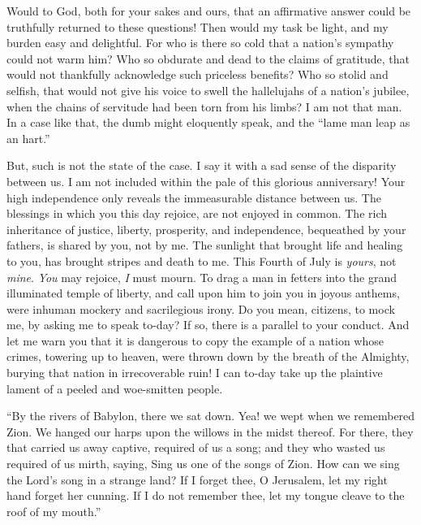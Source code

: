 Would to God, both for your sakes and ours, that an affirmative answer
could be truthfully returned to these questions! Then would my task be
light, and my burden easy and delightful. For who is there so cold that
a nation's sympathy could not warm him? Who so obdurate and dead to the
claims of gratitude, that would not thankfully acknowledge such
priceless benefits? Who so stolid and selfish, that would not give his
voice to swell the hallelujahs of a nation's jubilee, when the chains of
servitude had been torn from his limbs? I am not that man. In a case
like that, the dumb might eloquently speak, and the ``lame man leap as
an hart.''

But, such is not the state of the case. I say it with a sad sense of the
disparity between us. I am not included within the pale of this glorious
anniversary! Your high independence only reveals the immeasurable
distance between us. The blessings in which you this day rejoice, are
not enjoyed in common. The rich inheritance of justice, liberty,
prosperity, and independence, bequeathed by your fathers, is shared by
you, not by me. The sunlight that brought life and healing to you, has
brought stripes and death to me. This Fourth of July is \emph{yours},
not \emph{mine}. \emph{You} may rejoice, \emph{I} must mourn. To drag a
man in fetters into the grand illuminated temple of liberty, and call
upon him to join you in joyous anthems, were inhuman mockery and
sacrilegious irony. Do you mean,
{\protect\hypertarget{442}{}{}}citizens, to mock me, by asking me to
speak to-day? If so, there is a parallel to your conduct. And let me
warn you that it is dangerous to copy the example of a nation whose
crimes, towering up to heaven, were thrown down by the breath of the
Almighty, burying that nation in irrecoverable ruin! I can to-day take
up the plaintive lament of a peeled and woe-smitten people.

``By the rivers of Babylon, there we sat down. Yea! we wept when we
remembered Zion. We hanged our harps upon the willows in the midst
thereof. For there, they that carried us away captive, required of us a
song; and they who wasted us required of us mirth, saying, Sing us one
of the songs of Zion. How can we sing the Lord's song in a strange land?
If I forget thee, O Jerusalem, let my right hand forget her cunning. If
I do not remember thee, let my tongue cleave to the roof of my mouth.''

